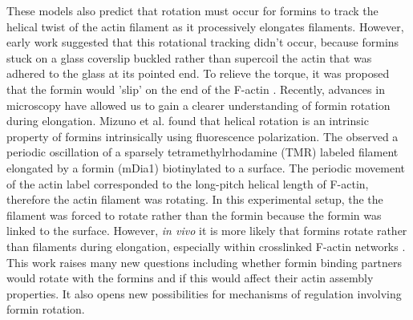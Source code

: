 These models also predict that rotation must occur for formins to track the helical twist of the actin filament as it processively elongates filaments. However, early work suggested that this rotational tracking didn't occur, because formins stuck on a glass coverslip buckled rather than supercoil the actin that was adhered to the glass at its pointed end. To relieve the torque, it was proposed that the formin would 'slip' on the end of the F-actin \citep{kovar_insertional_2004,shemesh_novel_2005}. Recently, advances in microscopy have allowed us to gain a clearer understanding of formin rotation during elongation. Mizuno et al. found that helical rotation is an intrinsic property of formins intrinsically using fluorescence polarization. The observed a periodic oscillation of a sparsely tetramethylrhodamine (TMR) labeled filament elongated by a formin (mDia1) biotinylated to a surface. The periodic movement of the actin label corresponded to the long-pitch helical length of F-actin, therefore the actin filament was rotating. In this experimental setup, the the filament was forced to rotate rather than the formin because the formin was linked to the surface. However, \textit{in vivo} it is more likely that formins rotate rather than filaments during elongation, especially within crosslinked F-actin networks \citep{mizuno_rotational_2011}. This work raises many new questions including whether formin binding partners would rotate with the formins and if this would affect their actin assembly properties. It also opens new possibilities for mechanisms of regulation involving formin rotation. 

